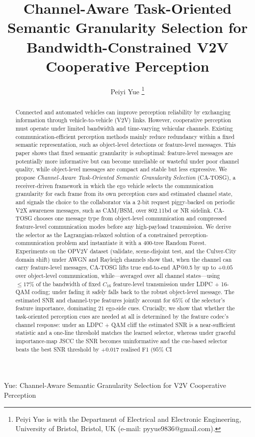 \documentclass[journal]{IEEEtran}
\newcommand{\method}{CA-TOSG}
\begin{document}
\title{Channel-Aware Task-Oriented Semantic Granularity Selection for Bandwidth-Constrained V2V Cooperative Perception}

\author{
Peiyi Yue%
\thanks{Peiyi Yue is with the Department of Electrical and Electronic Engineering, University of Bristol, Bristol, UK (e-mail: pyyue9836@gmail.com).}
}

{Yue: Channel-Aware Semantic Granularity Selection for V2V Cooperative Perception}

\maketitle

\begin{abstract}
Connected and automated vehicles can improve perception reliability by exchanging information through vehicle-to-vehicle (V2V) links. However, cooperative perception must operate under limited bandwidth and time-varying vehicular channels. Existing communication-efficient perception methods mainly reduce redundancy within a fixed semantic representation, such as object-level detections or feature-level messages. This paper shows that fixed semantic granularity is suboptimal: feature-level messages are potentially more informative but can become unreliable or wasteful under poor channel quality, while object-level messages are compact and stable but less expressive. We propose \emph{Channel-Aware Task-Oriented Semantic Granularity Selection} (\method), a receiver-driven framework in which the ego vehicle selects the communication granularity for each frame from its own perception cues and estimated channel state, and signals the choice to the collaborator via a $2$-bit request piggy-backed on periodic V2X awareness messages, such as CAM/BSM, over 802.11bd or NR sidelink. \method{} chooses one message type from object-level communication and compressed feature-level communication modes before any high-payload transmission. We derive the selector as the Lagrangian-relaxed solution of a constrained perception-communication problem and instantiate it with a $400$-tree Random Forest. Experiments on the OPV2V dataset (validate, scene-disjoint test, and the Culver-City domain shift) under AWGN and Rayleigh channels show that, when the channel can carry feature-level messages, \method{} lifts true end-to-end AP@0.5 by up to $+0.05$ over object-level communication, while---averaged over all channel states---using $\le 17\%$ of the bandwidth of fixed $C_{16}$ feature-level transmission under LDPC + 16-QAM coding; under fading it safely falls back to the robust object-level message. The estimated SNR and channel-type features jointly account for $65\%$ of the selector's feature importance, dominating $21$ ego-side cues. Crucially, we show that whether the task-oriented perception cues are needed at all is determined by the feature codec's channel response: under an LDPC + QAM cliff the estimated SNR is a near-sufficient statistic and a one-line threshold matches the learned selector, whereas under graceful importance-map JSCC the SNR becomes uninformative and the cue-based selector beats the best SNR threshold by $+0.017$ realised F1 ($95\%$ CI 
\end{abstract}
\end{document}
